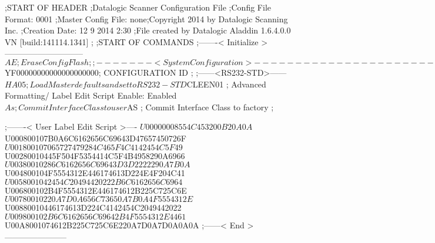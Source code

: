 ;START OF HEADER
;Datalogic Scanner Configuration File
;Config File Format: 0001
;Master Config File: none;Copyright 2014 by Datalogic Scanning Inc.
;Creation Date: 12 9 2014 2:30
;File created by Datalogic Aladdin 1.6.4.0.0 VN [build:141114.1341]
;
;START OF COMMANDS
;-------< Initialize >-----------------------------
$AE                 ; Erase Config Flash
;
;-------< System Configuration >-------------------------------
$YF00000000000000000000; CONFIGURATION ID
;
;------<RS232-STD>------
$HA05              ; Load Master defaults and set to RS232-STD
$CLEEN01            ; Advanced Formatting/ Label Edit Script Enable: Enabled
$As                 ; Commit Interface Class to user
$AS                 ; Commit Interface Class to factory
;

;-------< User Label Edit Script >----
$U00000008554C453200B20A0A
$U000800107B0A6C6162656C69643D47657450726F
$U001800107065727479284C465F4C4142454C5F49
$U00280010445F504F5354414C5F4B4958290A6966
$U00380010286C6162656C69643D3D2222290A7B0A
$U004800104F5554312E446174613D224E4F204C41
$U0058001042454C20494420222B6C6162656C6964
$U006800102B4F5554312E446174612B225C725C6E
$U00780010220A7D0A656C73650A7B0A4F5554312E
$U00880010446174613D224C4142454C2049442022
$U009800102B6C6162656C69642B4F5554312E4461
$U00A8001074612B225C725C6E220A7D0A7D0A0A0A
;------< End >-----------------------
